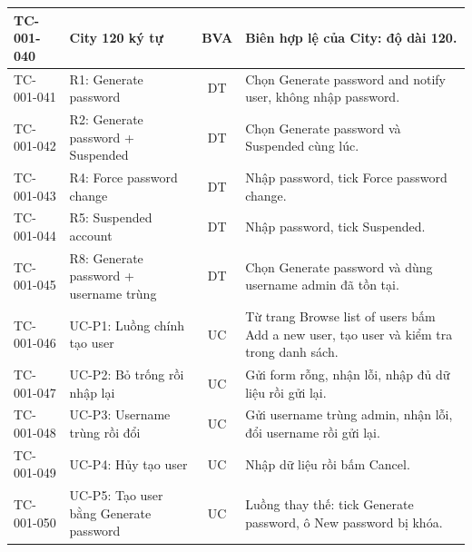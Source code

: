 {\begin{longtable}{|l|L{4.4cm}|c|L{6.4cm}|}
TC-001-040 & City 120 ký tự & BVA & Biên hợp lệ của City: độ dài 120. \\ \hline
TC-001-041 & R1: Generate password & DT & Chọn Generate password and notify user, không nhập password. \\ \hline
TC-001-042 & R2: Generate password + Suspended & DT & Chọn Generate password và Suspended cùng lúc. \\ \hline
TC-001-043 & R4: Force password change & DT & Nhập password, tick Force password change. \\ \hline
TC-001-044 & R5: Suspended account & DT & Nhập password, tick Suspended. \\ \hline
TC-001-045 & R8: Generate password + username trùng & DT & Chọn Generate password và dùng username admin đã tồn tại. \\ \hline
TC-001-046 & UC-P1: Luồng chính tạo user & UC & Từ trang Browse list of users bấm Add a new user, tạo user và kiểm tra trong danh sách. \\ \hline
TC-001-047 & UC-P2: Bỏ trống rồi nhập lại & UC & Gửi form rỗng, nhận lỗi, nhập đủ dữ liệu rồi gửi lại. \\ \hline
TC-001-048 & UC-P3: Username trùng rồi đổi & UC & Gửi username trùng admin, nhận lỗi, đổi username rồi gửi lại. \\ \hline
TC-001-049 & UC-P4: Hủy tạo user & UC & Nhập dữ liệu rồi bấm Cancel. \\ \hline
TC-001-050 & UC-P5: Tạo user bằng Generate password & UC & Luồng thay thế: tick Generate password, ô New password bị khóa. \\ \hline
\end{longtable}
}